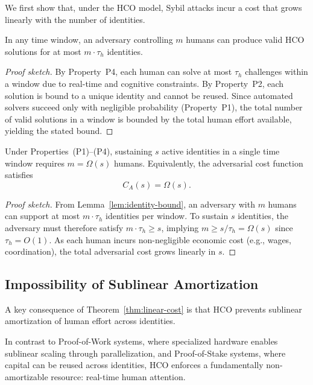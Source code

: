 \documentclass[sigconf,nonacm]{acmart}
\begin{document}
We first show that, under the HCO model, Sybil attacks incur a cost that grows linearly with the number of identities.

\begin{lemma}
	\label{lem:identity-bound}
	In any time window, an adversary controlling $m$ humans can produce valid HCO solutions for at most $m \cdot \tau_h$ identities.
\end{lemma}

\begin{proof}[Proof sketch]
	By Property~P4, each human can solve at most $\tau_h$ challenges within a window due to real-time and cognitive constraints. By Property~P2, each solution is bound to a unique identity and cannot be reused. Since automated solvers succeed only with negligible probability (Property~P1), the total number of valid solutions in a window is bounded by the total human effort available, yielding the stated bound.
\end{proof}

\begin{theorem}
	\label{thm:linear-cost}
	Under Properties~(P1)--(P4), sustaining $s$ active identities in a single time window requires $m = \Omega(s)$ humans. Equivalently, the adversarial cost function satisfies
	\[
	C_A(s) = \Omega(s).
	\]
\end{theorem}

\begin{proof}[Proof sketch]
	From Lemma~\ref{lem:identity-bound}, an adversary with $m$ humans can support at most $m \cdot \tau_h$ identities per window. To sustain $s$ identities, the adversary must therefore satisfy $m \cdot \tau_h \ge s$, implying $m \ge s / \tau_h = \Omega(s)$ since $\tau_h = O(1)$. As each human incurs non-negligible economic cost (e.g., wages, coordination), the total adversarial cost grows linearly in $s$.
\end{proof}

\subsection{Impossibility of Sublinear Amortization}

A key consequence of Theorem~\ref{thm:linear-cost} is that HCO prevents sublinear amortization of human effort across identities.

In contrast to Proof-of-Work systems, where specialized hardware enables sublinear scaling through parallelization, and Proof-of-Stake systems, where capital can be reused across identities, HCO enforces a fundamentally non-amortizable resource: real-time human attention.
\end{document}
